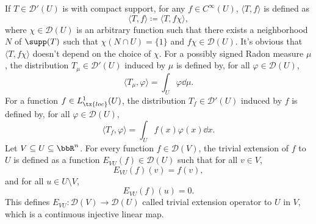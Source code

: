 \documentclass[a4paper,12pt]{report}
\begin{document}
If $T\in\mathcal{D}'(U)$ is with compact support, for any $f\in C^{\infty}(U)$, $\langle T,f\rangle$ is defined as
\[\langle T,f\rangle\coloneq\langle T,f\chi\rangle,\]
where $\chi\in\mathcal{D}(U)$ is an arbitrary function such that there exists a neighborhood $N$ of $\supp(T)$ such that $\chi(N\cap U)=\{1\}$ and $f\chi\in\mathcal{D}(U)$. It's obvious that $\langle T,f\chi\rangle$ doesn't depend on the choice of $\chi$.
For a possibly signed Radon measure $\mu$, the distribution $T_{\mu}\in\mathcal{D}'(U)$ induced by $\mu$ is defined by, for all $\varphi\in\mathcal{D}(U)$,
\[\langle T_{\mu},\varphi\rangle=\int_U\varphi\dd{\mu}.\]
For a function $f\in L^1_{\tx{loc}}(U)$, the distribution $T_f\in\mathcal{D}'(U)$ induced by $f$ is defined by, for all $\varphi\in\mathcal{D}(U)$,
\[\langle T_f,\varphi\rangle=\int_Uf(x)\varphi(x)\dd{x}.\]
Let $V\subseteq U\subseteq\bbR^n$. For every function $f\in\mathcal{D}(V)$, the trivial extension of $f$ to $U$ is defined as a function $E_{VU}(f)\in\mathcal{D}(U)$ such that for all $v\in V$,
\[E_{VU}(f)(v)=f(v),\]
and for all $u\in U\setminus V$,
\[E_{VU}(f)(u)=0.\]
This defines $E_{VU}\colon\mathcal{D}(V)\to\mathcal{D}(U)$ called trivial extension operator to $U$ in $V$, which is a continuous injective linear map.
\end{document}

